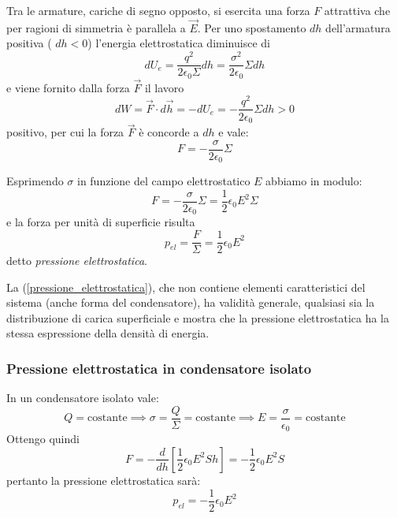 \documentclass[class=book, crop=false, oneside, 12pt]{standalone}
\begin{document}
Tra le armature, cariche di segno opposto, si esercita una forza \(F\) attrattiva che per ragioni di simmetria è parallela a \(\overrightarrow{E}\).  
Per uno spostamento \(dh\) dell'armatura positiva ( \(dh < 0\)) l'energia elettrostatica diminuisce di
\begin{equation*}
    d U_e = \frac{q^2}{2 \epsilon_0 \Sigma} dh = \frac{\sigma^2}{2 \epsilon_0}  \Sigma dh
\end{equation*}
e viene fornito dalla forza \(\overrightarrow{F}\) il lavoro
\begin{equation*}
    d W = \overrightarrow{F} \cdot d \overrightarrow{h} = - d U_e = - \frac{q^2}{2 \epsilon_0} \Sigma dh > 0
\end{equation*}
positivo, per cui la forza \(\overrightarrow{F}\) è concorde a \(dh\) e vale:
\begin{equation}
    F =  - \frac{\sigma}{2 \epsilon_0} \Sigma 
\end{equation}

Esprimendo \(\sigma\) in funzione del campo elettrostatico \(E\) abbiamo in modulo:
\begin{equation*}
    F =  - \frac{\sigma}{2 \epsilon_0} \Sigma = \frac{1}{2} \epsilon_0 E^2 \Sigma
\end{equation*}
e la forza per unità di superficie risulta 
\begin{equation} \label{pressione_elettrostatica}
    p_{el} = \frac{F}{\Sigma} = \frac{1}{2} \epsilon_0 E^2
\end{equation} 
detto \emph{pressione elettrostatica}.

La (\ref{pressione_elettrostatica}), che non contiene elementi caratteristici del sistema (anche forma del condensatore), ha validità generale, qualsiasi sia la distribuzione di carica superficiale e mostra che la pressione elettrostatica ha la stessa espressione della densità di energia. 

\subsubsection*{Pressione elettrostatica in condensatore isolato}

In un condensatore isolato vale:
\begin{equation*}
    Q = \text{costante} \implies \sigma = \frac{Q}{\Sigma} = \text{costante} \implies E = \frac{\sigma}{\epsilon_0} = \text{costante}
\end{equation*}
Ottengo quindi
\begin{equation*}
    F = - \frac{d}{dh} \left[\frac{1}{2} \epsilon_0 E^2 S h\right] = - \frac{1}{2} \epsilon_0 E^2 S
\end{equation*}
pertanto la pressione elettrostatica sarà:
\begin{equation*}
    p_{el} = - \frac{1}{2} \epsilon_0 E^2
\end{equation*}
\end{document}
